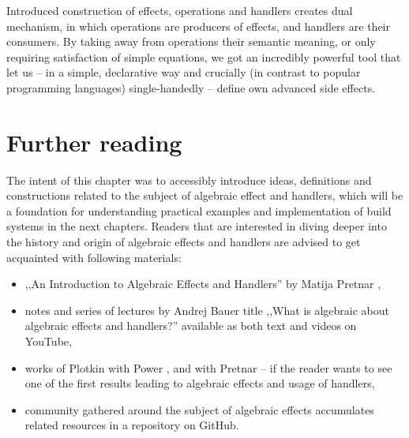 Introduced construction of effects, operations and handlers creates dual mechanism, in which operations are producers of effects, and handlers are their consumers. By taking away from operations their semantic meaning, or only requiring satisfaction of simple equations, we got an incredibly powerful tool that let us -- in a simple, declarative way and crucially (in contrast to popular programming languages) single-handedly -- define own advanced side effects.

\section{Further reading}

The intent of this chapter was to accessibly introduce ideas, definitions and constructions related to the subject of algebraic effect and handlers, which will be a foundation for understanding practical examples and implementation of build systems in the next chapters. Readers that are interested in diving deeper into the history and origin of algebraic effects and handlers are advised to get acquainted with following materials:

\begin{itemize}
\item ,,An Introduction to Algebraic Effects and Handlers'' by Matija Pretnar \cite{pretnar2015introduction},
\item notes and series of lectures by Andrej Bauer title ,,What is algebraic about algebraic effects and handlers?'' \cite{bauer2018algebraic} available as both text and videos on YouTube,
\item works of Plotkin with Power \cite{plotkin2001semantics, plotkin2002computational}, and with Pretnar \cite{plotkin2013handling} -- if the reader wants to see one of the first results leading to algebraic effects and usage of handlers,
\item community gathered around the subject of algebraic effects accumulates related resources in a repository \cite{effectsbibliography} on GitHub.

\end{itemize}
